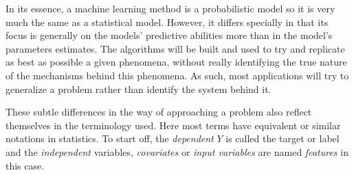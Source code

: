 	
	In its essence, a machine learning method is a probabilistic model so it is very much the same as a statistical model. However, it differs specially in that its focus is generally on the models' predictive abilities more than in the model's parameters estimates.\cite{breiman-statisticalmodeling} The algorithms will be built and used to try and replicate as best as possible a given phenomena, without really identifying the true nature of the mechanisms behind this phenomena. As such, most applications will try to generalize a problem rather than identify the system behind it.
	
	
	These subtle differences in the way of approaching a problem also reflect themselves in the terminology used. Here most terms have equivalent or similar notations in statistics. To start off, the \textit{dependent} $Y$ is called the target or label and the \textit{independent} variables, \textit{covariates} or \textit{input variables} are named \textit{features} in this case. 

